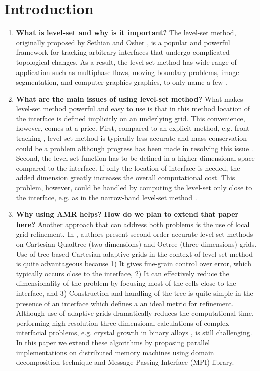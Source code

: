 \section{Introduction}
\begin{enumerate}
\item \textbf{What is level-set and why is it important?}
The level-set method, originally proposed by Sethian and Osher \cite{Osher;Sethian:88:Fronts-Propagating-w}, is a popular and powerful framework for tracking arbitrary interfaces that undergo complicated topological changes. As a result, the level-set method has wide range of application such as multiphase flows, moving boundary problems, image segmentation, and computer graphics graphics, to only name a few \cite{Osher;Fedkiw:01:Level-Set-Methods:-A,Sethian:99:Level-set-methods-an}.

\item \textbf{What are the main issues of using level-set method?}
What makes level-set method powerful and easy to use is that in this method location of the interface is defined implicitly on an underlying grid. This convenience, however, comes at a price. First, compared to an explicit method, e.g. front tracking , level-set method is typically less accurate and mass conservation could be a problem although progress has been made in resolving this issue \cite{Enright;Fedkiw;Ferziger;etal:02:A-Hybrid-Particle-Le}. Second, the level-set function has to be defined in a higher dimensional space compared to the interface. If only the location of interface is needed, the added dimension greatly increases the overall computational cost. This problem, however, could be handled by computing the level-set only close to the interface, e.g. as in the narrow-band level-set method \cite{Brun;Guittet;Gibou:12:A-local-level-set-me}.

\item \textbf{Why using AMR helps? How do we plan to extend that paper here?}
Another approach that can address both problems is the use of local grid refinement. In \cite{Min;Gibou:07:A-second-order-accur}, authors present second-order accurate level-set methods on Cartesian Quadtree (two dimensions) and Octree (three dimensions) grids. Use of tree-based Cartesian adaptive grids in the context of level-set method is quite advantageous because 1) It gives fine-grain control over error, which typically occurs close to the interface, 2) It can effectively reduce the dimensionality of the problem by focusing most of the cells close to the interface, and 3) Construction and handling of the tree is quite simple in the presence of an interface which defines a an ideal metric for refinement. Although use of adaptive grids dramatically reduces the computational time, performing high-resolution three dimensional calculations of complex interfacial problems, e.g. crystal growth in binary alloys , is still challenging. In this paper we extend these algorithms by proposing parallel implementations on distributed memory machines using domain decomposition technique and Message Passing Interface (MPI) library.


\end{enumerate}
